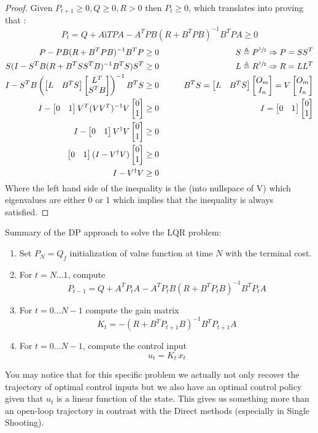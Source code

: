 \begin{proof}
Given $P_{t+1}\ge0 , Q\ge0, R>0$ then $P_t\ge0$, which translates into proving that :
\[P_t = Q + AìTPA - A^TPB(R+B^TPB)^{-1}B^TPA\ge0\]
\begin{align*}
P-PB(R+B^TPB)^{-1}B^TP&\ge 0&\qquad S\triangleq P^{\sfrac{1}{2}}\Rightarrow P = SS^T\\
S(I-S^TB(R+B^TSS^TB)^{-1}B^TS)S^T&\ge0&\qquad L\triangleq R^{\sfrac{1}{2}}\Rightarrow R=LL^T\\
I-S^TB\left(\begin{bmatrix}L&B^TS\end{bmatrix}\begin{bmatrix}L^T\\S^TB\end{bmatrix}\right)^{-1}B^TS&\ge0&\qquad B^TS = \begin{bmatrix}L&B^TS\end{bmatrix}\begin{bmatrix}O_m\\I_n\end{bmatrix} = V\begin{bmatrix}O_m\\I_n\end{bmatrix}\\
I-\begin{bmatrix}0&1\end{bmatrix}V^T(VV^T)^{-1}V\begin{bmatrix}0\\1\end{bmatrix}&\ge0&\qquad I = \begin{bmatrix}0&1\end{bmatrix}\begin{bmatrix}0\\1\end{bmatrix}\\
I-\begin{bmatrix}0&1\end{bmatrix}V^{\dagger}V\begin{bmatrix}0\\1\end{bmatrix}&\ge0&\\
\begin{bmatrix}0&1\end{bmatrix}(I-V^{\dagger}V)\begin{bmatrix}0\\1\end{bmatrix}&\ge0&\\
I-V^{\dagger}V&\ge0&
\end{align*}
Where the left hand side of the inequality is the  (into nullspace of V) which eigenvalues are either 0 or 1 which implies that the inequality is always satisfied.
\end{proof}

Summary of the DP approach to solve the LQR problem:
\begin{enumerate}
\item Set $P_N = Q_f$ initialization of value function at time $N$ with the terminal cost.
\item For $t= N...1$, compute
\[P_{t-1} = Q + A^TP_tA - A^TP_tB(R+B^TP_tB)^{-1}B^TP_tA\]
\item For $t = 0...N-1$ compute the gain matrix
\[K_t = -(R+B^TP_{t+1}B)^{-1} B^TP_{t+1}A\]
\item For $t = 0...N-1$, compute the control input
\[u_t = K_t\,x_t\]
\end{enumerate}
You may notice that for this specific problem we actually not only recover the trajectory of optimal control inputs but we also have an optimal control policy given that $u_t$ is a linear function of the state. This gives us something more than an open-loop trajectory in contrast with the Direct methods (especially in Single Shooting).

